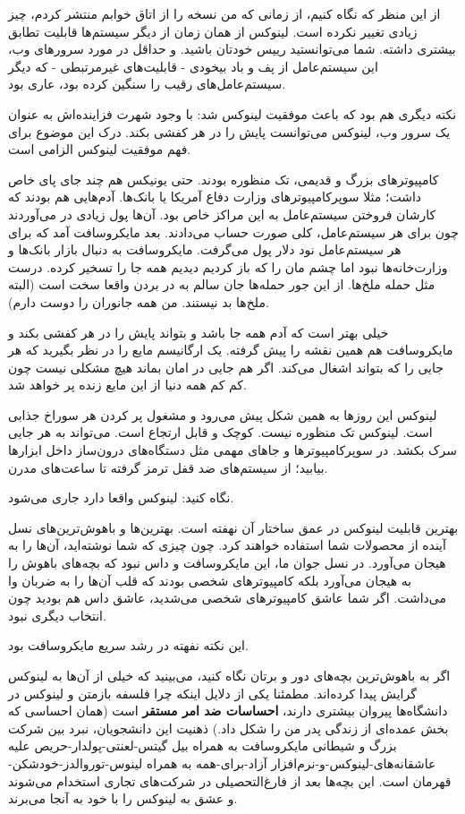 از این منظر که نگاه کنیم، از زمانی که من نسخه  را از اتاق
خوابم منتشر کردم،‌ چیز زیادی تغییر نکرده است. لینوکس از همان زمان از
دیگر سیستم‌ها قابلیت تطابق بیشتری داشته. شما می‌توانستید رییس خودتان
باشید. و حداقل در مورد سرورهای وب، این سیستم‌عامل از پف و باد بیخودی -
قابلیت‌های غیرمرتبطی - که دیگر سیستم‌عامل‌های رقیب را سنگین کرده بود،
عاری بود.

نکته دیگری هم بود که باعث موفقیت لینوکس شد: با وجود شهرت فزاینده‌اش به
عنوان یک سرور وب، لینوکس می‌توانست پایش را در هر کفشی بکند. درک این
موضوع برای فهم موفقیت لینوکس الزامی است.

کامپیوترهای بزرگ و قدیمی، تک منظوره بودند. حتی یونیکس هم چند جای پای
خاص داشت؛ مثلا سوپرکامپیوترهای وزارت دفاع آمریکا یا بانک‌ها. آدم‌هایی هم
بودند که کارشان فروختن سیستم‌عامل به این مراکز خاص بود. آن‌ها پول زیادی
در می‌آوردند چون برای هر سیستم‌عامل، کلی صورت حساب می‌دادند. بعد
مایکروسافت آمد که برای هر سیستم‌عامل نود دلار پول می‌گرفت. مایکروسافت به
دنبال بازار بانک‌ها و وزارت‌خانه‌ها نبود اما چشم مان را که باز کردیم
دیدیم همه جا را تسخیر کرده. درست مثل حمله ملخ‌ها. از این جور حمله‌ها جان
سالم به در بردن واقعا سخت است (البته ملخ‌ها بد نیستند. من همه جانوران
را دوست دارم).

خیلی بهتر است که آدم همه جا باشد و بتواند پایش را در هر کفشی بکند و
مایکروسافت هم همین نقشه را پیش گرفته. یک ارگانیسم مایع را در نظر
بگیرید که هر جایی را که بتواند اشغال می‌کند. اگر هم جایی در امان بماند
هیچ مشکلی نیست چون کم کم همه دنیا از این مایع زنده پر خواهد شد.

لینوکس این روزها به همین شکل پیش می‌رود و مشغول پر کردن هر سوراخ جذابی
است. لینوکس تک منظوره نیست. کوچک و قابل ارتجاع است. می‌تواند به هر جایی
سرک بکشد. در سوپرکامپیوترها و جاهای مهمی مثل دستگاه‌های
درون‌ساز داخل ابزارها
بیابید؛ از سیستم‌های ضد قفل ترمز گرفته تا ساعت‌های مدرن.

نگاه کنید: لینوکس واقعا دارد جاری می‌شود.

بهترین قابلیت لینوکس در عمق ساختار آن نهفته است. بهترین‌ها و
باهوش‌ترین‌های نسل آینده از محصولات شما استفاده خواهند کرد. چون چیزی که
شما نوشته‌اید، آن‌ها را به هیجان می‌آورد. در نسل جوان ما، این مایکروسافت
و داس نبود که بچه‌های باهوش را به هیجان می‌آورد بلکه کامپیوترهای شخصی
بودند که قلب آن‌ها را به ضربان وا می‌داشت. اگر شما عاشق کامپیوترهای شخصی
می‌شدید، عاشق داس هم بودید چون انتخاب دیگری نبود.

این نکته نفهته در رشد سریع مایکروسافت بود. 

اگر به باهوش‌ترین بچه‌های دور و برتان نگاه کنید، می‌بینید که خیلی از آن‌ها
به لینوکس گرایش پیدا کرده‌اند. مطمئنا یکی از دلایل اینکه چرا فلسفه
بازمتن و لینوکس در دانشگاه‌ها پیروان بیشتری دارند، \textbf{احساسات ضد
  امر مستقر} است (همان احساسی که
بخش عمده‌ای از زندگی پدر من را شکل داد.) ذهنیت این دانشجویان، نبرد بین
شرکت بزرگ و شیطانی مایکروسافت به همراه بیل گیتس-لعنتی-پولدار-حریص علیه
عاشقانه‌های-لینوکس-و-نرم‌افزار آزاد-برای-همه به همراه
لینوس-توروالدز-خودشکن-قهرمان است. این بچه‌ها بعد از فارغ‌التحصیلی در
شرکت‌های تجاری استخدام می‌شوند و عشق به لینوکس را با خود به آنجا می‌برند.

